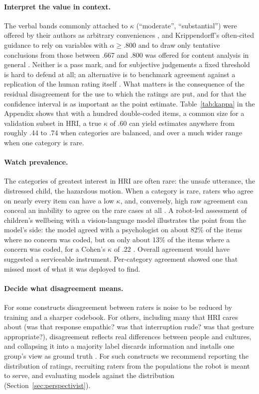 \paragraph{Interpret the value in context.} The verbal bands commonly
attached to $\kappa$ (``moderate'', ``substantial'') were offered by their
authors as arbitrary conveniences \cite{landis1977measurement}, and
Krippendorff's often-cited guidance to rely on variables with
$\alpha\geq.800$ and to draw only tentative conclusions from those between
.667 and .800 was offered for content analysis in general
\cite{krippendorff2019content}. Neither is a pass mark, and for subjective
judgements a fixed threshold is hard to defend at all; an alternative is to
benchmark agreement against a replication of the human rating itself
\cite{wong2021crossreplication}. What matters is the
consequence of the residual disagreement for the use to which the ratings are
put, and for that the confidence interval is as important as the point
estimate. Table~\ref{tab:kappa} in the Appendix shows that with a hundred
double-coded items, a common size for a validation subset in HRI, a true
$\kappa$ of .60 can yield estimates anywhere from roughly .44 to .74 when
categories are balanced, and over a much wider range when one category is
rare.

\paragraph{Watch prevalence.} The categories of greatest interest in HRI are
often rare: the unsafe utterance, the distressed child, the hazardous motion.
When a category is rare, raters who agree on nearly every item can have a low
$\kappa$, and, conversely, high raw agreement can conceal an inability to
agree on the rare cases at all \cite{feinstein1990high,byrt1993bias}. A
robot-led assessment of children's wellbeing with a vision-language model
illustrates the point from the model's side: the model agreed with a
psychologist on about 82\% of the items where no concern was coded, but on
only about 13\% of the items where a concern was coded, for a Cohen's
$\kappa$ of .22 \cite{abbasi2025robotled}. Overall agreement would have
suggested a serviceable instrument. Per-category agreement showed one that
missed most of what it was deployed to find.

\paragraph{Decide what disagreement means.} For some constructs disagreement
between raters is noise to be reduced by training and a sharper codebook. For
others, including many that HRI cares about (was that response empathic? was
that interruption rude? was that gesture appropriate?), disagreement reflects
real differences between people and cultures, and collapsing it into a
majority label discards information and installs one group's view as ground
truth \cite{aroyo2015truth,plank2022problem,uma2021learning}. For such
constructs we recommend reporting the distribution of ratings, recruiting
raters from the populations the robot is meant to serve, and evaluating
models against the distribution (Section~\ref{sec:perspectivist}).

